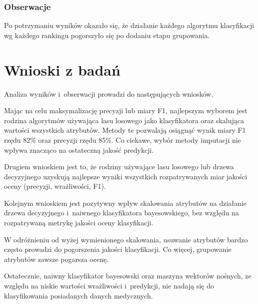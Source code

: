 \documentclass[../thesis.tex]{subfiles}
\begin{document}
\subsubsection{Obserwacje}

Po potrzymaniu wyników okazało się, że działanie każdego algorytmu klasyfikacji wg każdego rankingu pogorszyło się po dodaniu etapu grupowania.

\section{Wnioski z badań}

Analiza wyników i~obserwacji prowadzi do następujących wniosków.

Mając na celu maksymalizację precyzji lub miary F1, najlepszym wyborem jest rodzina algorytmów używająca lasu losowego jako klasyfikatora oraz skalująca wartości wszystkich atrybutów. Metody te pozwalają osiągnąć wynik miary F1 rzędu 82\% oraz precyzji rzędu 85\%. Co ciekawe, wybór metody imputacji nie wpływa znacząco na ostateczną jakość predykcji.

Drugiem wnioskiem jest to, że rodziny używające lasu losowego lub drzewa decyzyjnego uzyskują najlepsze wyniki wszystkich rozpatrywanych miar jakości oceny (precyzji, wrażliwości, F1).

Kolejnym wnioskiem jest pozytywny wpływ skalowania atrybutów na działanie drzewa decyzyjnego i~naiwnego klasyfikatora bayesowskiego, bez względu na rozpatrywaną metrykę jakości oceny klasyfikacji.

W odróżnieniu od wyżej wymienionego skalowania, usuwanie atrybutów bardzo często prowadzi do pogorszenia jakości klasyfikacji. Co więcej, grupowanie atrybutów zawsze pogarsza ocenę.

Ostatecznie, naiwny klasyfikator bayesowski oraz maszyna wektorów nośnych, ze względu na niskie wartości wrażliwości i~predykcji, nie nadają się do klasyfikowania posiadanych danych medycznych.
\end{document}
